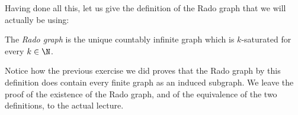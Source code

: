 \documentclass[nobib]{tufte-handout}
\begin{document}
Having done all this, let us give the definition of the Rado graph that we will actually be using:

\begin{definition}
  The \emph{Rado graph} is the unique countably infinite graph which is $k$-saturated for every $k \in \N$.
\end{definition}

Notice how the previous exercise we did proves that the Rado graph by this definition does contain every finite graph as an induced subgraph. We leave the proof of the existence of the Rado graph, and of the equivalence of the two definitions, to the actual lecture.


%
%
\end{document}

